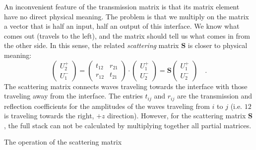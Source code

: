 An inconvenient feature of the transmission matrix is that its matrix element have no direct physical meaning. The problem is that we multiply on the matrix a vector that is half an input, half an output of this interface. We know what comes out (travels to the left), and the matrix should tell us what comes in from the other side. In this sense, the related \emph{scattering} matrix $\mathbf{S}$ is closer to physical meaning:
\begin{equation}
\begin{pmatrix}
U_2^+ \\ U_1^-
\end{pmatrix}
= 
\begin{pmatrix}
t_{12} & r_{21}  \\ r_{12} & t_{21}
\end{pmatrix}
\cdot
\begin{pmatrix}
U_1^+ \\ U_2^-
\end{pmatrix}
%
= \mathbf{S}
\begin{pmatrix}
U_1^+ \\ U_2^-
\end{pmatrix} \quad . 
\end{equation}
The scattering matrix connects waves traveling towards the interface with those traveling away from the interface. The entries $t_{ij}$ and $r_{ij}$ are the transmission and reflection coefficients for the amplitudes of the waves traveling from $i$ to $j$ (i.e. $12$ is traveling towards the right, $+z$ direction). However, for the scattering matrix $\mathbf{S}$, the full stack can not be calculated by multiplying together all partial matrices.

\begin{marginfigure}

\caption{The operation of the scattering matrix
\label{fig:6_S_matrix}}
\end{marginfigure}

